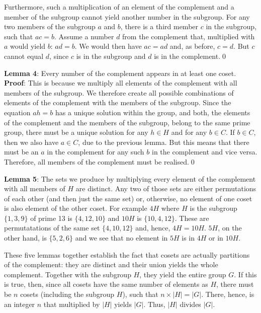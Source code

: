 \documentclass{scrreprt}
\begin{document}
{Furthermore, such a multiplication
of an element of the complement
and a member of the subgroup
cannot yield another number in the subgroup.
For any two members of the subgroup $a$ and $b$,
there is a third member $c$ in the subgroup,
such that $ac = b$.
Assume a number $d$ from the complement that,
multiplied with $a$ would yield $b$:
$ad = b$. We would then have $ac = ad$ and,
as before, $c = d$.
But $c$ cannot equal $d$, since $c$ is in the subgroup
and $d$ is in the complement.\qed

\textbf{Lemma 4}:
Every number of the complement
appears in at least one coset.\\
\textbf{Proof}:
This is because we multiply
all elements of the complement
with all members of the subgroup.
We therefore create all possible combinations
of elements of the complement
with the members of the subgroup.
Since the equation $ah = b$ has a unique 
solution within the group, and 
both, the elements of the complement
and the members of the subgroup,
belong to the same prime group,
there must be a unique solution for 
any $h \in H$ and for any $b \in C$.
If $b \in C$, then we also have
$a \in C$, due to the previous lemma.
But this means that there must be an $a$
in the complement
for any such $b$ in the complement and vice versa.
Therefore, all members of the complement
must be realised.\qed

\textbf{Lemma 5}:
The sets we produce
by multiplying every element of the complement
with all members of $H$
are distinct. Any two of those sets 
are either permutations of each other
(and then just the same set)
or, otherwise, no element of one coset is also element
of the other coset.
For example $4H$ where $H$ is the 
subgroup $\lbrace 1,3,9\rbrace$ of prime 13
is $\lbrace 4,12,10\rbrace$
and $10H$ is $\lbrace 10,4,12\rbrace$.
These are permutatations of the same set
$\lbrace 4,10,12\rbrace$ and, hence,
$4H = 10H$.
$5H$, on the other hand, is 
$\lbrace 5,2,6\rbrace$ and we see
that no element in $5H$ is in $4H$ or
in $10H$.

These five lemmas together establish
the fact that cosets are actually
partitions of the complement:
they are distinct and their
union yields the whole complement.
Together with the subgroup $H$,
they yield the entire group $G$.
If this is true, then,
since all cosets have the same number
of elements as $H$,
there must be $n$ cosets (including the subgroup $H$),
such that $n \times |H| = |G|$.
There, hence, is an integer $n$ that
multiplied by $|H|$ yields $|G|$.
Thus, $|H|$ divides $|G|$.

}
\end{document}
